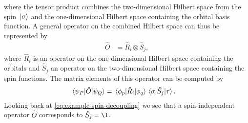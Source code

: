         where the tensor product combines the two-dimensional Hilbert space from
        the spin $\ket*{\sigma}$ and the one-dimensional Hilbert space containing
        the orbital basis function.
        A general operator on the combined Hilbert space can thus be represented
        by
        \begin{align}
            \hat{O}
            &= \hat{R}_i \otimes \hat{S}_j,
        \end{align}
        where $\hat{R}_i$ is an operator on the one-dimensional Hilbert space
        containing the orbitals and $\hat{S}_j$ an operator on the
        two-dimensional Hilbert space containing the spin functions.
        The matrix elements of this operator can be computed by
        \begin{align}
            \mel*{\psi_{P}}{\hat{O}}{\psi_{Q}}
            &=
            \mel*{\phi_p}{\hat{R}_i}{\phi_q}
            \mel*{\sigma}{\hat{S}_j}{\tau}.
        \end{align}
        Looking back at \autoref{eq:example-spin-decoupling} we see that a
        spin-independent operator $\hat{O}$ corresponds to $\hat{S}_j = \1$.

